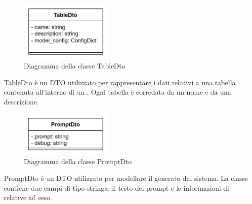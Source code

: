  \label{TableDto}
\begin{figure}[H]
    \centering
    \includegraphics[width=0.4\textwidth]{assets/Backend/table_dto.png}
    \caption{Diagramma della classe TableDto}
  \end{figure}
\par TableDto è un DTO utilizzato per rappresentare i dati relativi a una tabella contenuta all'interno di un . Ogni tabella è corredata da un nome e da una descrizione.

 \label{PromptDto}
\begin{figure}[H]
    \centering
    \includegraphics[width=0.4\textwidth]{assets/Backend/prompt_dto.png}
    \caption{Diagramma della classe PromptDto}
\end{figure}
\par PromptDto è un DTO utilizzato per modellare il  generato dal sistema. La classe contiene due campi di tipo stringa: il testo del prompt e le informazioni di  relative ad esso.